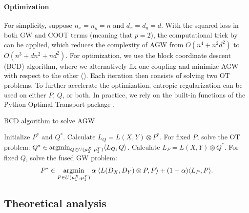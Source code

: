 \paragraph{Optimization} For simplicity, suppose $n_x = n_y = n$ and $d_x = d_y = d$.
With the squared loss in both GW and COOT terms (meaning that $p=2$),
the computational trick by \citet{Peyre16}
can be applied, which reduces the complexity of AGW from $O(n^4 + n^2 d^2)$
to $O(n^3 + dn^2 + nd^2)$. For optimization, we use the block coordinate descent (BCD) algorithm,
where we alternatively fix one coupling and minimize AGW with respect to the other ().
Each iteration then consists of solving two OT problems. To further accelerate the optimization,
entropic regularization \citep{Cuturi13} can be used on either $P$, $Q$, or both.
In practice, we rely on the built-in functions of the Python Optimal Transport package \citep{Flamary21}.

\begin{algorithm}[t]
    \caption{BCD algorithm to solve AGW \label{alg:bcd_agw}}
    \begin{algorithmic}[1]
      \STATE Initialize $P^*$ and $Q^*$.
      \REPEAT
      \STATE Calculate $L_Q = L(X, Y) \otimes P^*$.
      \STATE For fixed $P$, solve the OT problem:
      $Q^* \in \operatorname*{argmin}_{Q \in U(\mu_2^X, \mu_2^Y)} \langle L_Q, Q \rangle$.
      \STATE Calculate $L_P = L(X, Y) \otimes Q^*$.
      \STATE For fixed $Q$, solve the fused GW problem:
      \begin{align}
        P^* \in \operatorname*{argmin}_{P \in U(\mu_1^X, \mu_1^Y)}
        \alpha \; \langle L(D_X,D_Y) \otimes P, P \rangle + (1-\alpha) \langle L_P, P \rangle.
      \end{align}
\end{algorithmic}
\end{algorithm}

\subsection{Theoretical analysis} \label{subsec:agw_property}

